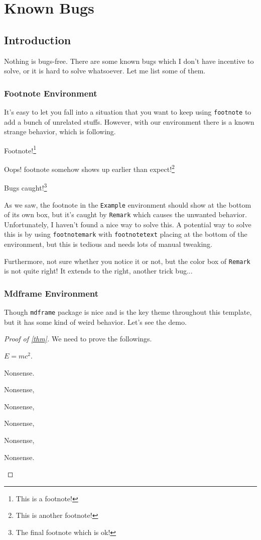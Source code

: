 \chapter{Known Bugs}

\section{Introduction}
Nothing is bugs-free. There are some known bugs which I don't have incentive to solve, or it is hard to solve whatsoever. Let me list some of them.

\subsection{Footnote Environment}
It's easy to let you fall into a situation that you want to keep using \texttt{footnote} to add a bunch of unrelated stuffs. However, with our environment there is a known strange behavior, which is following.
\begin{eg}
	Footnote!\footnote{This is a footnote!}
	\begin{remark}
		Oops! footnote somehow shows up earlier than expect!\footnote{This is another footnote!}
	\end{remark}

	Bugs caught!\footnote{The final footnote which is ok!}
\end{eg}

As we saw, the footnote in the \texttt{Example} environment should show at the bottom of its own box, but it's caught by \texttt{Remark} which causes the unwanted behavior. Unfortunately, I haven't found a nice way to solve this. A potential way to solve this is by using \texttt{footnotemark} with \texttt{footnotetext} placing at the bottom of the environment, but this is tedious and needs lots of manual tweaking.

Furthermore, not sure whether you notice it or not, but the color box of \texttt{Remark} is not quite right! It extends to the right, another trick bug...

\subsection{Mdframe Environment}
Though \texttt{mdframe} package is nice and is the key theme throughout this template, but it has some kind of weird behavior. Let's see the demo.

\begin{proof}[Proof of \autoref{thm}]
	We need to prove the followings.
	\begin{claim}
		\(E = mc^{2} \).
	\end{claim}
	\begin{explanation}

		Nonsense.

		Nonsense,

		Nonsense,

		Nonsense,

		Nonsense,

		Nonsense.
	\end{explanation}

\end{proof}

